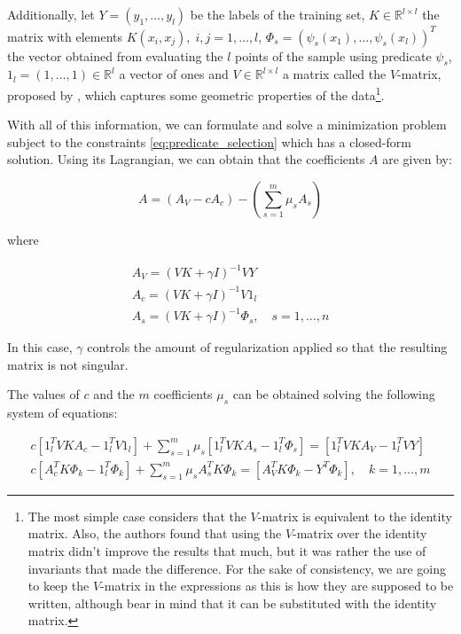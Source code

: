 Additionally, let $Y = (y_1, \dots, y_l)$  be the labels of the training set,  $K \in \mathbb{R}^{l \times l}$
the matrix with elements $K(x_i, x_j),\; i, j = 1, \dots, l$, $\Phi_s = (\psi_s(x_1), \dots, \psi_s(x_l))^T$
the vector obtained from evaluating the $l$ points of the sample using predicate $\psi_s$,
$1_l = (1, \dots, 1) \in \mathbb{R}^l$ a vector of ones and $V \in \mathbb{R}^{l \times l}$ a matrix called
the $V$-matrix, proposed by \cite{Vapnik2015}, which captures some geometric properties of the data\footnote{The
most simple case considers that the $V$-matrix is equivalent to the identity matrix. Also, the authors found
that using the $V$-matrix over the identity matrix didn't improve the results that much, but it was rather the
use of invariants that made the difference. For the sake of consistency, we are going to keep the $V$-matrix in
the expressions as this is how they are supposed to be written, although bear in mind that it can be substituted with
the identity matrix.}.

With all of this information, we can formulate and solve a minimization problem subject to the constraints
\eqref{eq:predicate_selection} which has a closed-form solution. Using its Lagrangian, we can obtain that the
coefficients $A$ are given by:

\[
    A = (A_V - cA_c) - \left( \sum_{s=1}^m \mu_s A_s \right)
\]

where

\begin{equation*}
    \begin{gathered}
        A_V = (VK + \gamma I)^{-1} VY \\
        A_c = (VK + \gamma I)^{-1} V1_l \\
        A_s = (VK + \gamma I)^{-1} \Phi_s,\quad s = 1, \dots, n 
    \end{gathered}
\end{equation*}

In this case, $\gamma$ controls the amount of regularization applied so that the resulting matrix is not singular.

The values of $c$ and the $m$ coefficients $\mu_s$ can be obtained solving the following system of equations:

\begin{equation*}
    \begin{gathered}
        c [1_l^T VKA_c - 1_l^T V 1_l] + \sum_{s=1}^m \mu_s [1_l^T VKA_s - 1_l^T \Phi_s] = [1_l^T VKA_V - 1_l^T V Y] \\
        c [A_c^TK\Phi_k - 1_l^T\Phi_k] + \sum_{s=1}^m \mu_s A_s^T K \Phi_k = [A_V^T K \Phi_k - Y^T \Phi_k],\quad k=1, \dots, m
    \end{gathered}
\end{equation*}

